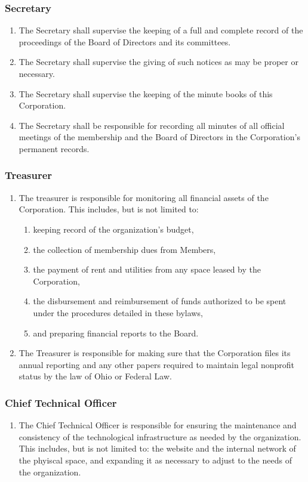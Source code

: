\documentclass{article}
\begin{document}
\subsubsection{Secretary}
\begin{enumerate}
\item The Secretary shall supervise the keeping of a full and complete record of the 
proceedings of the Board of Directors and its committees.
\item The Secretary shall supervise the giving of such notices as may be proper or 
necessary.
\item The Secretary shall supervise the keeping of the minute books of this Corporation.
\item The Secretary shall be responsible for recording all minutes of all official meetings of 
the membership and the Board of Directors in the Corporation's permanent records.
\end{enumerate}
\subsubsection{Treasurer}
\begin{enumerate}
\item The treasurer is responsible for monitoring all financial assets of the Corporation.  
This includes, but is not limited to:
\begin{enumerate}
\item keeping record of the organization's budget,
\item the collection of membership dues from Members,
\item the payment of rent and utilities from any space leased by the Corporation,
\item the disbursement and reimbursement of funds authorized to be spent under the 
procedures detailed in these bylaws,
\item and preparing financial reports to the Board.
\end{enumerate}
\item The Treasurer is responsible for making sure that the Corporation files its annual 
reporting and any other papers required to maintain legal nonprofit status by the law of 
Ohio or Federal Law.
\end{enumerate}
\subsubsection{Chief Technical Officer}
\begin{enumerate}
\item The Chief Technical Officer is responsible for ensuring the maintenance and
consistency of the technological infrastructure as needed by the organization.  This 
includes, but is not limited to: the website and the internal network of the phyiscal space, and expanding it as necessary to adjust to the needs of the organization.
\end{enumerate}
\end{document}
